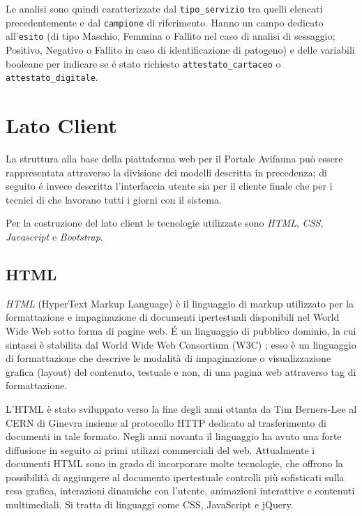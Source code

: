 Le analisi sono quindi caratterizzate dal \texttt{tipo\_servizio} tra quelli elencati precedentemente e dal \texttt{campione} di riferimento. Hanno un campo dedicato all'\texttt{esito} (di tipo Maschio, Femmina o Fallito nel caso di analisi di sessaggio; Positivo, Negativo o Fallito in caso di identificazione di patogeno) e delle variabili booleane per indicare se é stato richiesto \texttt{attestato\_cartaceo} o \texttt{attestato\_digitale}.

\newpage
\section{Lato Client}
\label{sec:client}
La struttura alla base della piattaforma web per il Portale Avifauna può essere rappresentata attraverso la divisione dei modelli descritta in precedenza; di seguito é invece descritta l'interfaccia utente sia per il cliente finale che per i tecnici di {\fem} che lavorano tutti i giorni con il sistema.

Per la costruzione del lato client le tecnologie utilizzate sono \emph{HTML}, \emph{CSS}, \emph{Javascript} e \emph{Bootstrap}.

\subsection{HTML}
\label{subs:html}
\emph{HTML} (HyperText Markup Language) è il linguaggio di markup utilizzato per la formattazione e impaginazione di documenti ipertestuali disponibili nel World Wide Web sotto forma di pagine web. É un linguaggio di pubblico dominio, la cui sintassi è stabilita dal World Wide Web Consortium (W3C) \cite{html}; esso è un linguaggio di formattazione che descrive le modalità di impaginazione o visualizzazione grafica (layout) del contenuto, testuale e non, di una pagina web attraverso tag di formattazione.

L'HTML è stato sviluppato verso la fine degli anni ottanta da Tim Berners-Lee al CERN di Ginevra insieme al protocollo HTTP dedicato al trasferimento di documenti in tale formato. Negli anni novanta il linguaggio ha avuto una forte diffusione in seguito ai primi utilizzi commerciali del web. Attualmente i documenti HTML sono in grado di incorporare molte tecnologie, che offrono la possibilità di aggiungere al documento ipertestuale controlli più sofisticati sulla resa grafica, interazioni dinamiche con l'utente, animazioni interattive e contenuti multimediali. Si tratta di linguaggi come CSS, JavaScript e jQuery.

